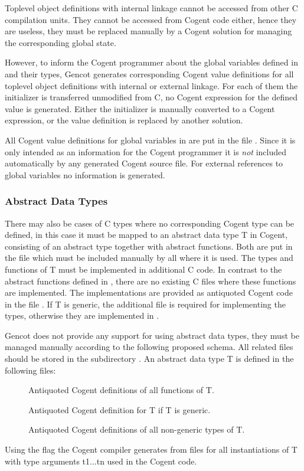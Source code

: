 Toplevel object definitions with internal linkage cannot be accessed from other C compilation units. They cannot be
accessed from Cogent code either, hence they are useless, they must be replaced manually by a Cogent solution for
managing the corresponding global state. 

However, to inform the Cogent programmer about the global variables defined in  and their types, Gencot 
generates corresponding Cogent value definitions for all toplevel object definitions with internal or external linkage. 
For each of them the initializer is transferred unmodified from C, no Cogent expression for the defined value is 
generated. Either the initializer is manually converted to a Cogent expression, or the value definition is replaced
by another solution. 

All Cogent value definitions for global variables in  are put in the file . Since it
is only intended as an information for the Cogent programmer it is \textit{not} included automatically by any generated
Cogent source file. For external references to global variables no information is generated.

\subsubsection{Abstract Data Types}

There may also be cases of C types where no corresponding Cogent type can be defined, in this case it must be mapped to an 
abstract data type T in Cogent, consisting of an abstract type together with abstract functions. Both are put in 
the file  which must be included manually by all  where it is used. The types and 
functions of T must be implemented in additional C code. In contrast to the abstract functions defined in ,
there are no existing C files where these functions are implemented. The implementations are provided as antiquoted Cogent 
code in the file . If T is generic, the additional file  is required for 
implementing the types, otherwise they are implemented in . 

Gencot does not provide any support for using abstract data types, they must be managed manually according to the following
proposed schema. All related files should be stored in the subdirectory .
An abstract data type T is defined in the following files:
\begin{description}
\item[] Antiquoted Cogent definitions of all functions of T. 
\item[] Antiquoted Cogent definition for T if T is generic.
\item[] Antiquoted Cogent definitions of all non-generic types of T.
\end{description}
Using the flag  the Cogent compiler generates from  files  for all 
instantiations of T with type arguments t1...tn used in the Cogent code.

